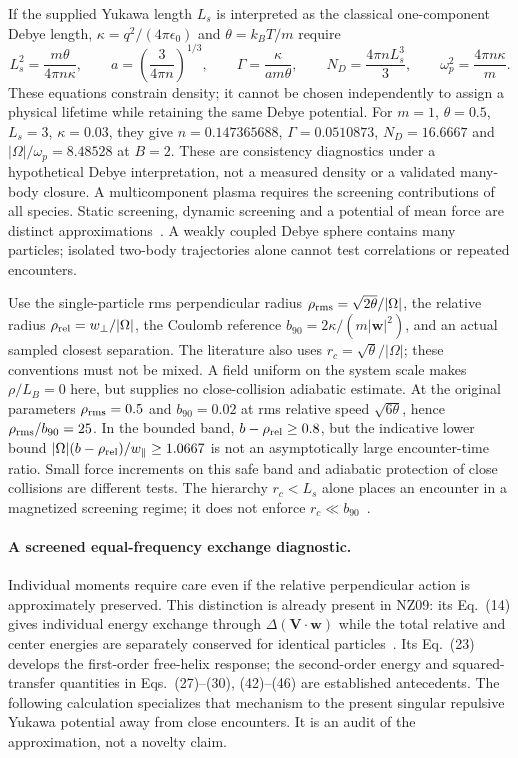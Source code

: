 \documentclass[11pt,letterpaper]{article}
\begin{document}
If the supplied Yukawa length $L_s$ is interpreted as the classical
one-component Debye length, $\kappa=q^2/(4\pi\epsilon_0)$ and
$\theta=k_BT/m$ require
\begin{equation}
 L_s^2=\frac{m\theta}{4\pi n\kappa},\qquad
 a=\left(\frac3{4\pi n}\right)^{1/3},\qquad
 \Gamma=\frac{\kappa}{a m\theta},\qquad
 N_D=\frac{4\pi nL_s^3}{3},\qquad
 \omega_p^2=\frac{4\pi n\kappa}{m}.
 \label{eq:screeningdensity}
\end{equation}
These equations constrain density; it cannot be chosen independently to
assign a physical lifetime while retaining the same Debye potential. For
$m=1$, $\theta=0.5$, $L_s=3$, $\kappa=0.03$, they give
$n=0.147365688$, $\Gamma=0.0510873$, $N_D=16.6667$ and
$|\Omega|/\omega_p=8.48528$ at $B=2$. These are consistency diagnostics
under a hypothetical Debye interpretation, not a measured density or a
validated many-body closure. A multicomponent plasma requires the screening
contributions of all species. Static screening, dynamic screening and a
potential of mean force are distinct approximations~\cite{NZ09,NZ10,JB20}.
A weakly coupled Debye sphere contains many particles; isolated two-body
trajectories alone cannot test correlations or repeated encounters.

Use the single-particle rms perpendicular radius
$\rho_{\rm rms}=\sqrt{2\theta}/|\Omega|$, the relative radius
$\rho_{\rm rel}=w_\perp/|\Omega|$, the Coulomb reference
$b_{90}=2\kappa/(m|\bm w|^2)$, and an actual sampled closest separation.
The literature also uses $r_c=\sqrt{\theta}/|\Omega|$; these conventions
must not be mixed. A field uniform on the system scale makes
$\rho/L_B=0$ here, but supplies no close-collision adiabatic estimate.
At the original parameters $\rho_{\rm rms}=0.5$ and
$b_{90}=0.02$ at rms relative speed $\sqrt{6\theta}$, hence
$\rho_{\rm rms}/b_{90}=25$. In the bounded band,
$b-\rho_{\rm rel}\ge0.8$, but the indicative lower bound
$|\Omega|(b-\rho_{\rm rel})/w_\parallel\ge1.0667$ is not an
asymptotically large encounter-time ratio. Small force increments on this
safe band and adiabatic protection of close collisions are different tests.
The hierarchy $r_c<L_s$ alone places an encounter in a magnetized screening
regime; it does not enforce $r_c\ll b_{90}$~\cite{JB20}.

\paragraph{A screened equal-frequency exchange diagnostic.}
Individual moments require care even if the relative perpendicular action
is approximately preserved. This distinction is already present in NZ09:
its Eq.~(14) gives individual energy exchange through
$\Delta(\bm V\cdot\bm w)$ while the total relative and center energies
are separately conserved for identical particles~\cite{NZ09}. Its
Eq.~(23) develops the first-order free-helix response; the second-order
energy and squared-transfer quantities in Eqs.~(27)--(30), (42)--(46)
are established antecedents. The following calculation specializes that
mechanism to the present singular repulsive Yukawa potential away from
close encounters. It is an audit of the approximation, not a novelty claim.
\end{document}
